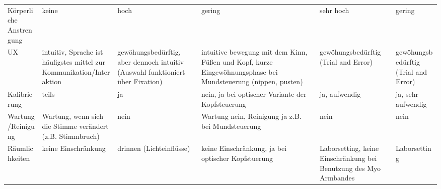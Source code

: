 \begin{landscape}
\begin{longtable}{|p{3cm}|p{3cm}|p{3cm}|p{3cm}|p{3cm}|p{3cm}|}
Körperliche Anstrengung & keine                                                                                           & hoch                                                                                                                                                      & gering                                                                                                                                     & sehr hoch                                                                                & gering                                                                   \\
UX                      & intuitiv, Sprache ist häufigstes mittel zur Kommunikation/Interaktion                           & gewöhungsbedürftig, aber dennoch intuitiv (Auswahl funktioniert über Fixation)                                                                            & intuitive bewegung mit dem Kinn, Füßen und Kopf, kurze Eingewöhnungsphase bei Mundsteuerung (nippen, pusten)                               & gewöhungsbedürftig (Trial and Error)                                                     & gewöhungsbedürftig (Trial and Error)                                     \\
Kalibrierung            & teils                                                                                           & ja                                                                                                                                                        & nein, ja bei optischer Variante der Kopfsteuerung                                                                                          & ja, aufwendig                                                                            & ja, sehr aufwendig                                                       \\
Wartung/Reinigung       & Wartung, wenn sich die Stimme verändert (z.B. Stimmbruch)                                       & nein                                                                                                                                                      & Wartung nein, Reinigung ja z.B. bei Mundsteuerung                                                                                          & nein                                                                                     & nein                                                                     \\
Räumlichkeiten          & keine Einschränkung                                                                             & drinnen (Lichteinflüsse)                                                                                                                                  & keine Einschränkung, ja bei optischer Kopfstuerung                                                                                         & Laborsetting, keine Einschränkung bei Benutzung des Myo Armbandes                        & Laborsetting                                                             \\

\end{longtable}
\end{landscape}
